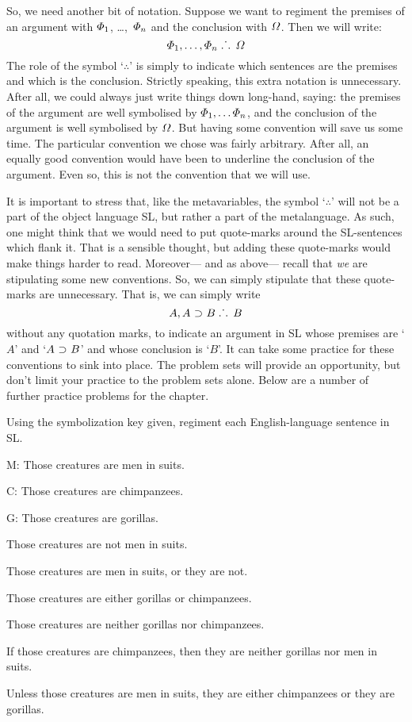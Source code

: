 So, we need another bit of notation. Suppose we want to regiment the premises of an argument with $\varPhi{}_1$, \dots,~$\varPhi{}_n$ and the conclusion with $\varOmega{}$. Then we will write:
$$\varPhi{}_1, \ldots, \varPhi{}_n \; \ldotp\dot{}\,\ldotp \; \varOmega{}$$
The role of the symbol `$\therefore$' is simply to indicate which sentences are the premises and which is the conclusion.
Strictly speaking, this extra notation is unnecessary.
After all, we could always just write things down long-hand, saying: the premises of the argument are well symbolised by $\varPhi{}_1, \ldots \varPhi{}_n$, and the conclusion of the argument is well symbolised by $\varOmega{}$.
But having some convention will save us some time.
The particular convention we chose was fairly arbitrary.
After all, an equally good convention would have been to underline the conclusion of the argument.
Even so, this is not the convention that we will use.

It is important to stress that, like the metavariables, the symbol `$\therefore$' will not be a part of the object language SL, but rather a part of the metalanguage.
As such, one might think that we would need to put quote-marks around the SL-sentences which flank it.
That is a sensible thought, but adding these quote-marks would make things harder to read.
Moreover--- and as above--- recall that \emph{we} are stipulating some new conventions.
So, we can simply stipulate that these quote-marks are unnecessary.
That is, we can simply write
$$A, A \mkern1mu\supset\mkern1mu B \; \ldotp\dot{}\,\ldotp \; B$$
without any quotation marks, to indicate an argument in SL whose premises are `$A$' and `$A \mkern1mu\supset\mkern1mu B$' and whose conclusion is `$B$'.
It can take some practice for these conventions to sink into place.
The problem sets will provide an opportunity, but don't limit your practice to the problem sets alone.
Below are a number of further practice problems for the chapter.



\iffalse

\practiceproblems

\solutions
\problempart Using the symbolization key given, regiment each English-language sentence in SL.
\label{pr.monkeysuits}
\begin{ekey}
\item[M:] Those creatures are men in suits. 
\item[C:] Those creatures are chimpanzees. 
\item[G:] Those creatures are gorillas.
\end{ekey}
\begin{earg}
\item Those creatures are not men in suits.
\item Those creatures are men in suits, or they are not.
\item Those creatures are either gorillas or chimpanzees.
\item Those creatures are neither gorillas nor chimpanzees.
\item If those creatures are chimpanzees, then they are neither gorillas nor men in suits.
\item Unless those creatures are men in suits, they are either chimpanzees or they are gorillas.
\end{earg}


